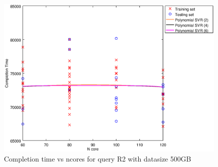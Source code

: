 
\begin {figure}[hbtp]
\centering
\includegraphics[width=\textwidth]{output/R2_500_ONLY_1_LINEAR_NCORE/plot_R2_500_bestmodels.eps}
\caption{Completion time vs ncores for query R2 with datasize 500GB}
\label{fig:only_1_linear_R2_500}
\end {figure}
